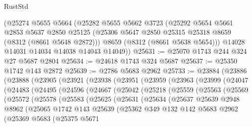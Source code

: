 \begin{lexlean}{RustStd}
\begin{coremodule}
    (@25274
      @5655
      @5664
      (@25282
        @5655
        @5662
        @3723
        (@25292
          @5654
          @5661
          @2853
          @5637
          @2850
          @25125
          (@25306 @5647 @2850 @25315 @25318 @8659 (@8312 (@8661 @5648 @2872)))
          @8659
          (@8312 (@8661 @5638 @5654)))
        @14028
        @14031
        @14034
        @14038
        @14043
        @14049))
@25631 := @25070 @1743 @244 @324 @27 @5687 @2804
@25634 := @24618 @1743 @324 @5687
@25637 := @25350 @1742 @143 @2872
@25639 := @2786 @5683 @2962
@25733 := @23884
    (@23886
      (@23888
        (@23905
          (@23921
            (@23938
              (@23951
                (@23959
                  (@23963
                    (@23999
                      (@24047
                        (@24483
                          (@24495
                            (@24596
                              (@24667
                                (@25042
                                  (@25218
                                    (@25559
                                      (@25563
                                        (@25569
                                          (@25572
                                            (@25578
                                              (@25583
                                                (@25625
                                                  (@25631
                                                    (@25634
                                                      (@25637
                                                        @25639
                                                        @2948
                                                        @8962
                                                        (@25065
                                                          @1742
                                                          @143
                                                          @25639
                                                          (@25362
                                                            @349
                                                            @132
                                                            @142
                                                            @5683
                                                            @2962
                                                            (@25369
                                                              @5683
                                                              (@25375
                                                                @5671

\end{coremodule}
\end{lexlean}
